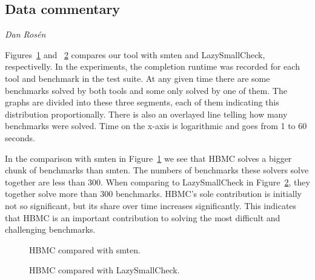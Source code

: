 \subsection*{Data commentary}
\vspace{-0.5\baselineskip}
\emph{Dan Rosén}
\vspace{0.5\baselineskip}

Figures~\ref{vs-smten} and ~\ref{vs-lazysc}
compares our tool with smten and LazySmallCheck, respectivelly.
%
In the experiments, the completion runtime was recorded
for each tool and benchmark in the test suite.
At any given time there are some benchmarks solved
by both tools and some only solved by one of them.
The graphs are divided into these three segments,
each of them indicating this distribution proportionally.
There is also an overlayed line telling how many benchmarks were solved.
Time on the x-axis is logarithmic and goes from 1 to 60 seconds.

In the comparison with smten in Figure~\ref{vs-smten}
we see that HBMC solves a bigger chunk of benchmarks than smten.
The numbers of benchmarks these solvers solve together are less than 300.
When comparing to LazySmallCheck in Figure~\ref{vs-lazysc},
they together solve more than 300 benchmarks.
HBMC's sole contribution is initially not so significant,
but its share over time increases significantly.
This indicates that HBMC is an important contribution
to solving the most difficult and challenging benchmarks.

\begin{figure}[H]
\begin{centering}
\end{centering}
\caption{HBMC compared with smten. \label{vs-smten}}
\end{figure}

\begin{figure}[H]
\begin{centering}
\end{centering}
\caption{HBMC compared with LazySmallCheck. \label{vs-lazysc}}
\end{figure}



